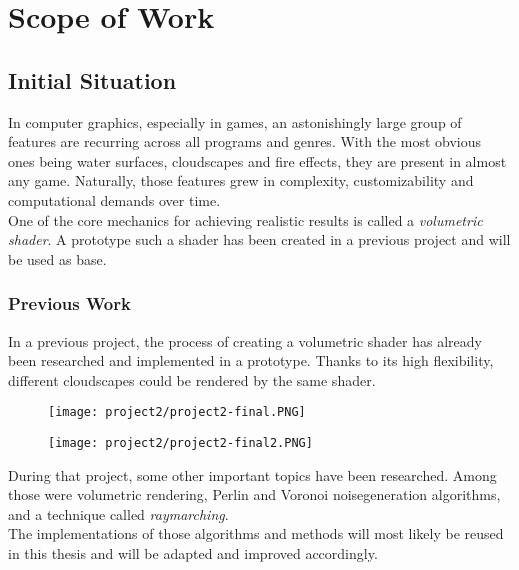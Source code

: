 \section{Scope of Work}

\subsection{Initial Situation}
In computer graphics, especially in games, an astonishingly large group of features are recurring across all programs and genres.
With the most obvious ones being water surfaces, cloudscapes and fire effects, they are present in almost any game. 
Naturally, those features grew in complexity, customizability and computational demands over time.
\\
One of the core mechanics for achieving realistic results is called a \emph{\gls{volumetric} \gls{shader}}.
A prototype such a \gls{shader} has been created in a previous project and will be used as base.

\subsubsection{Previous Work}
In a previous project, the process of creating a \gls{volumetric} \gls{shader} has already been researched and implemented in a prototype. Thanks to its high flexibility, different cloudscapes could be rendered by the same shader.

\begin{figure}[ht]
    \centering
        \begin{minipage}{0.47\linewidth}
            \texttt{[image: project2/project2-final.PNG]}
        \end{minipage}
    \hfill
        \begin{minipage}{0.47\linewidth}
            \texttt{[image: project2/project2-final2.PNG]}
        \end{minipage}  
\end{figure}

\noindent
During that project, some other important topics have been researched. Among those were \gls{volumetric} rendering, Perlin and Voronoi \gls{noisegeneration} algorithms, and a technique called \emph{\gls{raymarching}}.
\\
The implementations of those algorithms and methods will most likely be reused in this thesis and will be adapted and improved accordingly.

